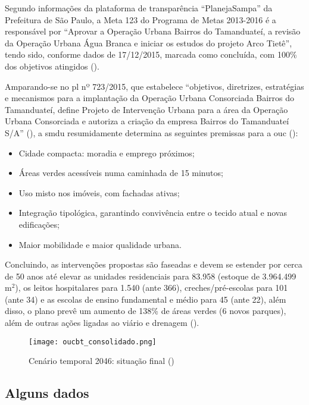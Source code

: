 \documentclass[11pt,fleqn]{book} %
\begin{document}
Segundo informações da plataforma de transparência ``PlanejaSampa'' da Prefeitura de São Paulo, a Meta 123 do Programa de Metas 2013-2016 é a responsável por ``Aprovar a Operação Urbana Bairros do Tamanduateí, a revisão da Operação Urbana Água Branca e iniciar os estudos do projeto Arco Tietê'', tendo sido, conforme dados de 17/12/2015, marcada como concluída, com 100\% dos objetivos atingidos (\cite{smg123}).

Amparando-se no \gls{pl} nº 723/2015, que estabelece ``objetivos, diretrizes, estratégias e mecanismos para a implantação da Operação Urbana Consorciada Bairros do Tamanduateí, define Projeto de Intervenção Urbana para a área da Operação Urbana Consorciada e autoriza a criação da empresa Bairros do Tamanduateí S/A'' (\cite{pl723}), a \gls{smdu} resumidamente determina as seguintes premissas para a \gls{ouc} (\cite{smdu2014}):

\begin{itemize}
	\item Cidade compacta: moradia e emprego próximos;
	\item Áreas verdes acessíveis numa caminhada de 15 minutos;
	\item Uso misto nos imóveis, com fachadas ativas;
	\item Integração tipológica, garantindo convivência entre o tecido atual e novas edificações;
	\item Maior mobilidade e maior qualidade urbana.
\end{itemize}

Concluindo, as intervenções propostas são faseadas e devem se estender por cerca de 50 anos até elevar as unidades residenciais para 83.958 (estoque de 3.964.499 m$^2$), os leitos hospitalares para 1.540 (ante 366), creches/pré-escolas para 101 (ante 34) e as escolas de ensino fundamental e médio para 45 (ante 22), além disso, o plano prevê um aumento de 138\% de áreas verdes (6 novos parques), além de outras ações ligadas ao viário e drenagem (\cite{smdu2014}).

\begin{figure}[h]
	\caption{Cenário temporal 2046: situação final (\cite{smdu2014})}
	\texttt{[image: oucbt\_consolidado.png]}
\end{figure}

\subsection{Alguns dados}
\end{document}
